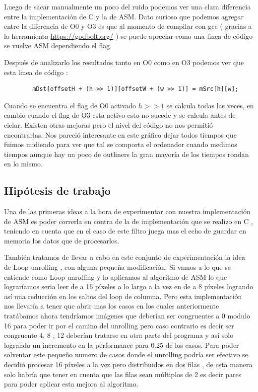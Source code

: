 Luego de sacar manualmente un poco del ruido podemos ver una clara diferencia entre la implementación de C y la de ASM. Dato curioso que podemos agregar entre la diferencia de O0 y O3 es que al momento de compilar con gcc ( gracias a la herramienta \url{https://godbolt.org/} ) se puede apreciar como una linea de código se vuelve ASM dependiendo el flag. 

Después de analizarlo los resultados tanto en O0 como en O3 podemos ver que esta linea de código :

\begin{lstlisting}
		mDst[offsetH + (h >> 1)][offsetW + (w >> 1)] = mSrc[h][w];
\end{lstlisting}

Cuando se encuentra el flag de O0 activado $h >> 1$ se calcula todas las veces, en cambio cuando el flag de O3 esta activo esto no sucede y se calcula antes de ciclar. Existen otras mejoras pero el nivel del código no nos permitió encontrarlas. Nos pareció interesante en este gráfico dejar todos tiempos que fuimos midiendo para ver que tal se comporta el ordenador cuando medimos tiempos aunque hay un poco de outliners la gran mayoría de los tiempos rondan en lo mismo.

\subsection{Hipótesis de trabajo}

Una de las primeras ideas a la hora de experimentar con nuestra implementación de ASM es poder correrla en contra de la de implementación que se realizo en C , teniendo en cuenta que en el caso de este filtro juega mas el echo de guardar en memoria los datos que de procesarlos.

También tratamos de llevar a cabo en este conjunto de experimentación la idea de Loop unrolling , con alguna pequeña modificación. Si vamos a lo que se entiende como Loop unrolling y lo aplicamos al algoritmo de ASM lo que lograríamos seria leer de a 16 píxeles a lo largo a la vez en de a 8 píxeles logrando así una reducción en los saltos del loop de columna. Pero esta implementación nos llevaría a tener que abrir mas los casos en los cuales anteriormente tratábamos ahora tendríamos imágenes que deberían ser congruentes a 0 modulo 16 para poder ir por el camino del unrolling pero caso contrario es decir ser congruente 4, 8 , 12 deberían tratarse en otra parte del programa y así solo logrando un incremento en la performance para 0.25 de los casos. Para poder solventar este pequeño numero de casos donde el unrolling podría ser efectivo se decidió procesar 16 píxeles a la vez pero distribuidos en dos filas , de esta manera solo habría que tener en cuenta que las filas sean múltiplos de 2 es decir pares para poder aplicar esta mejora al algoritmo.

